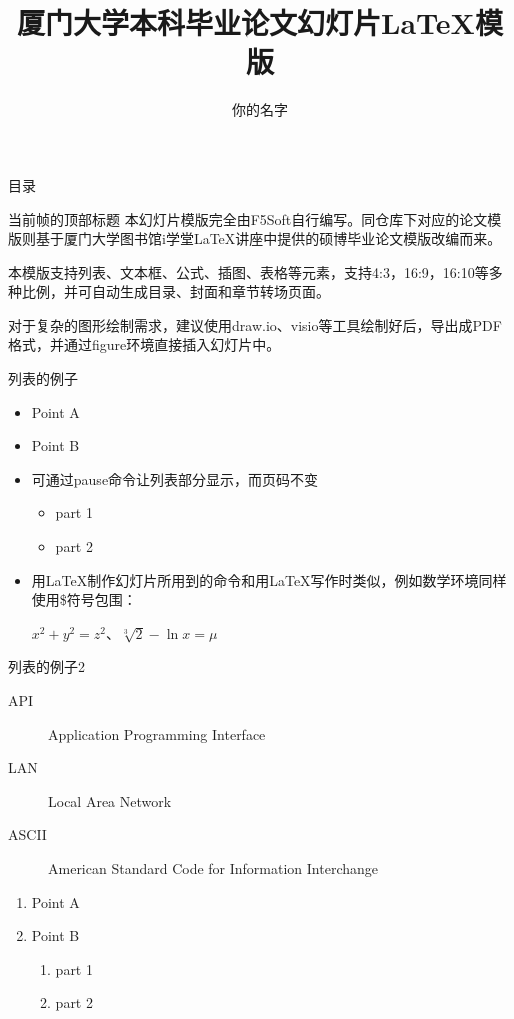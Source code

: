 \documentclass[aspectratio=169]{xmu-slide}
\title{厦门大学本科毕业论文幻灯片LaTeX模版}
\author{你的名字}
\begin{document}
\maketitle

\begin{frame}{目录}
    \tableofcontents
\end{frame}


\begin{frame}{当前帧的顶部标题}
    \color{red}本幻灯片模版完全由F5Soft自行编写。\color{black}同仓库下对应的论文模版则基于厦门大学图书馆i学堂LaTeX讲座中提供的硕博毕业论文模版改编而来。\par
    本模版支持列表、文本框、公式、插图、表格等元素，支持4:3，16:9，16:10等多种比例，并可自动生成目录、封面和章节转场页面。\par
    \color{red}对于复杂的图形绘制需求，建议使用draw.io、visio等工具绘制好后，导出成PDF格式，并通过figure环境直接插入幻灯片中。
\end{frame}

\begin{frame}{列表的例子}
    \begin{itemize}
        \item Point A
        \item Point B
        \pause
        \item 可通过pause命令让列表部分显示，而页码不变
              \begin{itemize}
                  \item part 1
                  \item part 2
              \end{itemize}
        \pause
        \item 用LaTeX制作幻灯片所用到的命令和用LaTeX写作时类似，例如数学环境同样使用\$符号包围： \par
              $x^2+y^2=z^2$、$\sqrt[3]{2}-\ln x=\mu$
    \end{itemize}
\end{frame}

\begin{frame}{列表的例子2}
    \begin{description}
        \item[API] Application Programming Interface
        \item[LAN] Local Area Network
        \item[ASCII] American Standard Code for Information Interchange
    \end{description}
    \begin{enumerate}[I]
        \item Point A
        \item Point B
              \begin{enumerate}[i]
                  \item part 1
                  \item part 2
              \end{enumerate}
    \end{enumerate}
\end{frame}
\end{document}
